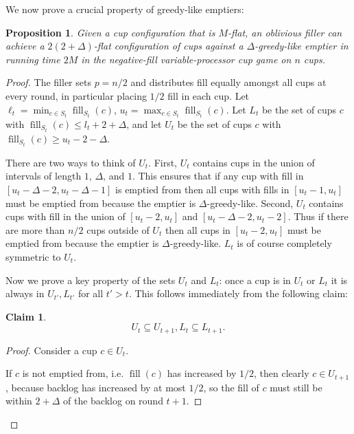 \documentclass[twocolumn]{article}[10pt]
\DeclareMathOperator{\fil}{\text{fill}}
\newtheorem{proposition}{Proposition}
\newtheorem{clm}{Claim}
\begin{document}
We now prove a crucial property of greedy-like emptiers: 
\begin{proposition}
  \label{prop:greedylikeisflat}
  Given a cup configuration that is $M$-flat, an oblivious filler can achieve a
  $2(2+\Delta)$-flat configuration of cups against a $\Delta$-greedy-like
  emptier in running time $2M$ in the negative-fill variable-processor cup
  game on $n$ cups.
\end{proposition}
\begin{proof}
  The filler sets $p=n/2$ and distributes fill equally amongst
  all cups at every round, in particular placing $1/2$ fill in each cup.
  Let $\ell_t = \min_{c\in S_t} \fil_{S_t}(c)$, $u_t=\max_{c\in S_t} \fil_{S_t}(c)$. Let
  $L_t$ be the set of cups $c$ with $\fil_{S_t}(c) \le l_t+2+\Delta$, and let
  $U_t$ be the set of cups $c$ with $\fil_{S_t}(c) \ge u_t-2-\Delta$.

  There are two ways to think of $U_t$. First, $U_t$ contains cups in the union
  of intervals of length $1$, $\Delta$, and $1$. This ensures that if any cup
  with fill in $[u_t-\Delta-2, u_t-\Delta-1]$ is emptied from then all cups
  with fills in $[u_t-1, u_t]$ must be emptied from because the emptier is
  $\Delta$-greedy-like. Second, $U_t$ contains cups with fill in the union of
  $[u_t-2, u_t]$ and $[u_t-\Delta-2, u_t-2]$. Thus if there are more than $n/2$
  cups outside of $U_t$ then all cups in $[u_t-2, u_t]$ must be emptied from
  because the emptier is $\Delta$-greedy-like. $L_t$ is of course completely
  symmetric to $U_t$.

  Now we prove a key property of the sets $U_t$ and $L_t$: once a cup is in
  $U_t$ or $L_t$ it is always in $U_{t'}, L_{t'}$ for all $t' > t$. This
  follows immediately from the following claim:
  \begin{clm}
    \label{clm:dontlosestuff}
    $$U_{t} \subseteq U_{t+1}, L_t \subseteq L_{t+1}.$$
  \end{clm}
  \begin{proof}
    Consider a cup $c\in U_t$.

    If $c$ is not emptied from, i.e. $\fil(c)$ has increased by $1/2$, then
    clearly $c \in U_{t+1}$, because backlog has increased by at most $1/2$, so
    the fill of $c$ must still be within $2+\Delta$ of the backlog on round $t+1$. 


\end{proof}
\end{proof}
\end{document}
